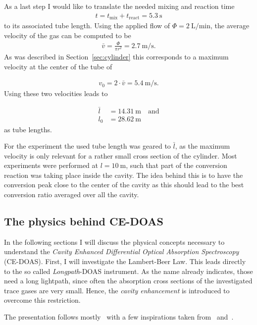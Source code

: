 As a last step I would like to translate the needed mixing and reaction
time
\begin{align*}
  t = t_{\text{mix}} + t_{\text{react}} = \SI{5.3}{\second}
\end{align*}
to its associated tube length. Using the applied flow of
$\Phi = \SI{2}{\liter\per\minute}$, the average velocity of the gas
can be computed to be
\begin{align*}
  \bar v = \frac{\Phi}{\pi r^2} = \SI{2.7}{\meter\per\second}. 
\end{align*}
As was described in Section~\ref{sec:cylinder} this corresponds to a
maximum velocity at the center of the tube of

\begin{align*}
  v_0 = 2\cdot \bar v = \SI{5.4}{\meter\per\second}.
\end{align*}
Using these two velocities leads to

\begin{align*}
  \bar l & = \SI{14.31}{\meter} \quad \text{and}\\
  l_0 & = \SI{28.62}{\meter}
\end{align*}
as tube lengths.

For the experiment the used tube length was geared to $\bar l$, as the
maximum velocity is only relevant for a rather small cross section of
the cylinder. Most experiments were performed at
$l = \SI{10}{\meter}$, such that part of the conversion reaction was
taking place inside the cavity. The idea behind this is to have the
conversion peak close to the center of the cavity as this should lead
to the best conversion ratio averaged over all the cavity.

\subsection{The physics behind CE-DOAS}
\label{sec:ce-doas-physics}

In the following sections I will discuss the physical concepts
necessary to understand the \emph{Cavity Enhanced Differential Optical
  Absorption Spectroscopy} (CE-DOAS). First, I will investigate the
Lambert-Beer Law. This leads directly to the so called
\emph{Longpath}-DOAS instrument. As the name already indicates, those
need a long lightpath, since often the absorption cross sections of
the investigated trace gases are very small. Hence, the \emph{cavity
  enhancement} is introduced to overcome this restriction.

The presentation follows mostly~\cite{fp58} with a few inspirations
taken from~\cite{bsc} and~\cite{platt}.

